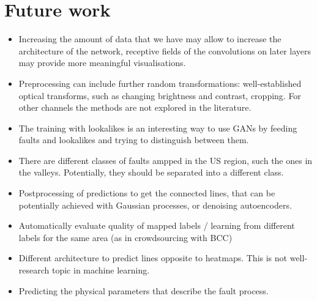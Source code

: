 \documentclass[11pt,a4paper]{article}
\begin{document}
\section{Future work}
\begin{itemize}
\item Increasing the amount of data that we have may allow to increase the architecture of the network, receptive
fields of the convolutions on later layers may provide more meaningful visualisations.
\item Preprocessing can include further random transformations: well-established optical transforms, such as changing
brightness and contrast, cropping. For other channels the methods are not explored in the literature.
\item The training with lookalikes is an interesting way to use GANs by feeding faults and lookalikes and trying to
distinguish between them.
\item There are different classes of faults ampped in the US region, such the ones in the valleys. Potentially,
they should be separated into a different class.
\item Postprocessing of predictions to get the connected lines, that can be potentially achieved with Gaussian processes,
or denoising autoencoders.
\item Automatically evaluate quality of mapped labels / learning from different labels for the same area (as in
crowdsourcing with BCC)
\item Different architecture to predict lines opposite to heatmaps. This is not well-research topic in machine learning.
\item Predicting the physical parameters that describe the fault process.
\end{itemize}

\printbibliography
\end{document}
